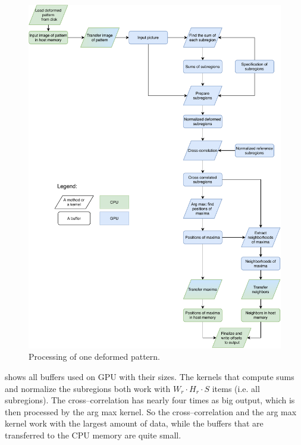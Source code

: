\begin{figure}
	\centering
	\includegraphics[width=\textwidth]{img/overview}
	\caption{Processing of one deformed pattern.}
	\label{overview}
\end{figure}

 shows all buffers used on GPU with their sizes. The kernels that compute sums and normalize the subregions both work with $W_r \cdot H_r \cdot S$ items (i.e. all subregions). The cross--correlation has nearly four times as big output, which is then processed by the arg max kernel. So the cross--correlation and the arg max kernel work with the largest amount of data, while the buffers that are transferred to the CPU memory are quite small.


